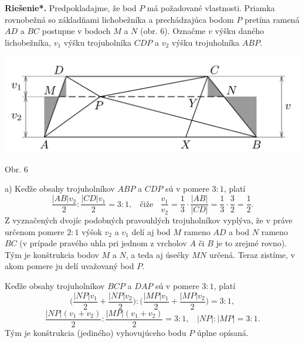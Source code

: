 \documentclass[11pt,a4paper,oneside,final]{book}
\newcommand{\rieh}{\textbf{Riešenie*.} }
\begin{document}
\rieh Predpokladajme, že bod $P$ má požadované vlastnosti. Priamka rovnobežná so základňami lichobežníka a prechádzajúca bodom $P$ pretína ramená $AD$ a $BC$ postupne v bodoch $M$ a $N$ (obr. 6). Označme $v$ výšku daného lichobežníka, $v_1$ výšku trojuholníka $CDP$ a $v_2$ výšku trojuholníka $ABP$.
\begin{center}
\includegraphics{64K3}

Obr. 6
\end{center}
a) Keďže obsahy trojuholníkov $ABP$ a $CDP$ sú v pomere $3 : 1$, platí
$$\frac{|AB|v_2}{2}:\frac{|CD|v_1}{2}= 3 : 1, \ \ \ \ \text{čiže} \ \ \ \ \frac{v_1}{v_2}=\frac{1}{3}\cdot \frac{|AB|}{|CD|}=\frac{1}{3}\cdot \frac{3}{2}=\frac{1}{2}.$$
Z vyznačených dvojíc podobných pravouhlých trojuholníkov vyplýva, že v práve určenom pomere $2 : 1$ výšok $v_2$ a $v_1$ delí aj bod $M$ rameno $AD$ a bod $N$ rameno $BC$ (v prípade pravého uhla pri jednom z vrcholov $A$ či $B$ je to zrejmé rovno). Tým je konštrukcia bodov $M$ a $N$, a teda aj úsečky $MN$ určená. Teraz zistíme, v akom pomere ju delí uvažovaný bod $P$.

Keďže obsahy trojuholníkov $BCP$ a $DAP$ sú v pomere $3 : 1$, platí
$$ \bigg(\frac{|NP|v_1}{2}+\frac{|NP|v_2}{2}\bigg): \bigg(\frac{|MP|v_1}{2}+\frac{|MP|v_2}{2}\bigg)= 3 : 1,$$
$$ \frac{|NP|(v_1 + v_2 )}{2}: \frac{|MP|(v_1 + v_2 )}{2}= 3 : 1, \ \ \ \  |NP| : |MP| = 3 : 1.$$
Tým je konštrukcia (jediného) vyhovujúceho bodu $P$ úplne opísaná.
\end{document}
